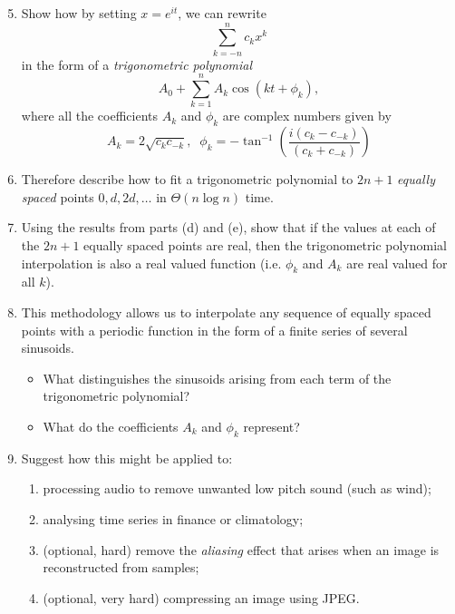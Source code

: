 \documentclass{article}
\begin{document}
\begin{question}
\begin{enumerate}[label=(\alph*)]
    \setcounter{enumi}{4}
    \item Show how by setting $x = e^{it}$, we can rewrite \[ \sum_{k=-n}^n c_k x^k \] in the form of a \emph{trigonometric polynomial} \[ A_0 + \sum_{k=1}^n A_k \cos(kt + \phi_k), \] where all the coefficients $A_k$ and $\phi_k$ are complex numbers given by
    \[ A_k = 2\sqrt{c_kc_{-k}}, \;\; \phi_k = -\tan^{-1}\left( \frac{i(c_k-c_{-k})}{(c_k+c_{-k})} \right) \]
    \item Therefore describe how to fit a trigonometric polynomial to $2n+1$ \emph{equally spaced} points $0, d, 2d, \ldots$ in $\Theta(n \log n)$ time.
    \item Using the results from parts (d) and (e), show that if the values at each of the $2n+1$ equally spaced points are real, then the trigonometric polynomial interpolation is also a real valued function (i.e. $\phi_k$ and $A_k$ are real valued for all $k$).
    \item This methodology allows us to interpolate any sequence of equally spaced points with a periodic function in the form of a finite series of several sinusoids.
    \begin{itemize}
        \item What distinguishes the sinusoids arising from each term of the trigonometric polynomial?
        \item What do the coefficients $A_k$ and $\phi_k$ represent?
    \end{itemize}
    \item Suggest how this might be applied to:
    \begin{enumerate}[label=(\roman*)]
        \item processing audio to remove unwanted low pitch sound (such as wind);
        \item analysing time series in finance or climatology;
        \item (optional, hard) remove the \emph{aliasing} effect that arises when an image is reconstructed from samples;
        \item (optional, very hard) compressing an image using JPEG.
    \end{enumerate}
\end{enumerate}
\end{question}
\end{document}
